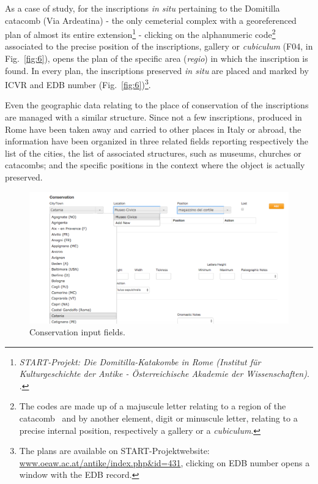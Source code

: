 \documentclass[amsthm,ebook]{saparticle}
\begin{document}
As a case of study, for the inscriptions \emph{in situ} pertaining to the Domitilla catacomb (Via Ardeatina) - the only
cemeterial complex with a georeferenced plan of almost its entire extension\footnote{\emph{START-Projekt: Die
Domitilla-Katakombe in Rome (Institut für Kulturgeschichte der Antike - Österreichische Akademie der Wissenschaften)}.
\citet{orlandi_case_2014}.} - clicking on the alphanumeric code\footnote{ The codes are made up of a majuscule letter
relating to a region of the catacomb \ and by another element, digit or minuscule letter, relating to a precise
internal position, respectively a gallery or a \emph{cubiculum}. } associated to the precise position of the inscriptions,
gallery or \emph{cubiculum} (F04, in Fig.~\ref{fig:6}), opens the plan of the specific area (\emph{regio}) in which the inscription is found.
In every plan, the inscriptions preserved \emph{in situ} are placed and marked by ICVR and EDB number (Fig.~\ref{fig:6})\footnote{The
plans are available on START-Projektwebsite: \url{www.oeaw.ac.at/antike/index.php\&id=431}, clicking on EDB number opens a
window with the EDB record. }.

Even the geographic data relating to the place of conservation of the inscriptions are managed with a similar structure.
Since not a few inscriptions, produced in Rome have been taken away and carried to other places in Italy or abroad, the
information have been organized in three related fields reporting respectively the list of the cities, the list of
associated structures, such as museums, churches or catacombs; and the specific positions in the context where the
object is actually preserved.




\begin{figure}[hbp]
\centering
 \includegraphics[width=\columnwidth]{Fig7.png}
\caption{Conservation input fields.}
\label{fig:7}
\end{figure}
\end{document}
